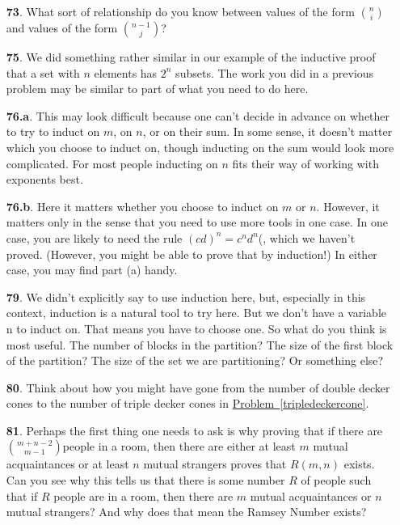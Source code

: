 \documentclass[10pt,]{book}
\theoremstyle{plain}
\theoremstyle{definition}
\theoremstyle{definition}
\numberwithin{equation}{chapter}
\begin{document}
\begin{itemize}[itemsep=1em]
\item[\textbf{73}.]\hypertarget{p-453}{}%
What sort of relationship do you know between values of the form \(\binom{n}{i}\) and values of the form \(\binom{n-1}{j}\)?%

\item[\textbf{75}.]\hypertarget{p-460}{}%
We did something rather similar in our example of the inductive proof that a set with \(n\) elements has \(2^n\) subsets. The work you did in a previous problem may be similar to part of what you need to do here.%

\item[\textbf{76.a}.]\hypertarget{p-464}{}%
This may look difficult because one can't decide in advance on whether to try to induct on \(m\), on \(n\), or on their sum. In some sense, it doesn't matter which you choose to induct on, though inducting on the sum would look more complicated. For most people inducting on \(n\) fits their way of working with exponents best.%

\item[\textbf{76.b}.]\hypertarget{p-468}{}%
Here it matters whether you choose to induct on \(m\) or \(n\). However, it matters only in the sense that you need to use more tools in one case. In one case, you are likely to need the rule \((cd)^n=c^n d^n\)(, which we haven't proved. (However, you might be able to prove that by induction!) In either case, you may find part (a) handy.%

\item[\textbf{79}.]\hypertarget{p-479}{}%
We didn't explicitly say to use induction here, but, especially in this context, induction is a natural tool to try here. But we don't have a variable n to induct on. That means you have to choose one. So what do you think is most useful. The number of blocks in the partition? The size of the first block of the partition? The size of the set we are partitioning? Or something else?%

\item[\textbf{80}.]\hypertarget{p-489}{}%
Think about how you might have gone from the number of double decker cones to the number of triple decker cones in \hyperref[tripledeckercone]{Problem~\ref{tripledeckercone}}.%

\item[\textbf{81}.]\hypertarget{p-499}{}%
Perhaps the first thing one needs to ask is why proving that if there are \(\binom{m+n-2}{m-1}\)people in a room, then there are either at least \(m\) mutual acquaintances or at least \(n\) mutual strangers proves that \(R(m, n)\) exists. Can you see why this tells us that there is some number \(R\) of people such that if \(R\) people are in a room, then there are \(m\) mutual acquaintances or \(n\) mutual strangers? And why does that mean the Ramsey Number exists?%


\end{itemize}
\end{document}

